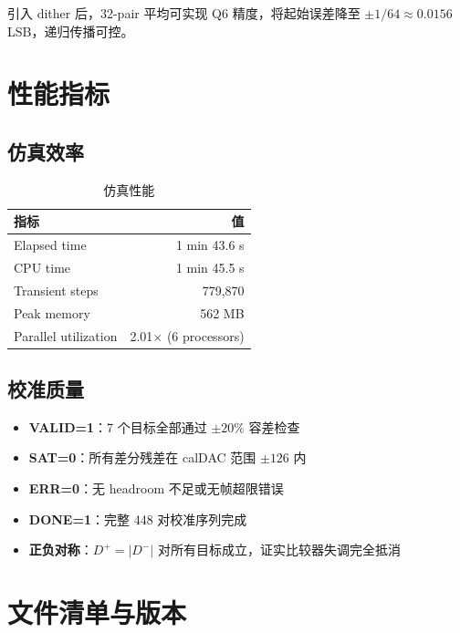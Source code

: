 \documentclass[12pt,a4paper]{article}
\begin{document}
引入 dither 后，32-pair 平均可实现 Q6 精度，将起始误差降至 $\pm 1/64 \approx 0.0156$ LSB，递归传播可控。

\section{性能指标}

\subsection{仿真效率}
\begin{table}[H]
\centering
\caption{仿真性能}
\begin{tabular}{lr}
\toprule
指标 & 值 \\
\midrule
Elapsed time & 1 min 43.6 s \\
CPU time & 1 min 45.5 s \\
Transient steps & 779,870 \\
Peak memory & 562 MB \\
Parallel utilization & 2.01$\times$ (6 processors) \\
\bottomrule
\end{tabular}
\end{table}

\subsection{校准质量}
\begin{itemize}
  \item \textbf{VALID=1}：7 个目标全部通过 $\pm20\%$ 容差检查
  \item \textbf{SAT=0}：所有差分残差在 calDAC 范围 $\pm126$ 内
  \item \textbf{ERR=0}：无 headroom 不足或无帧超限错误
  \item \textbf{DONE=1}：完整 448 对校准序列完成
  \item \textbf{正负对称}：$D^+ = |D^-|$ 对所有目标成立，证实比较器失调完全抵消
\end{itemize}

\section{文件清单与版本}
\end{document}
